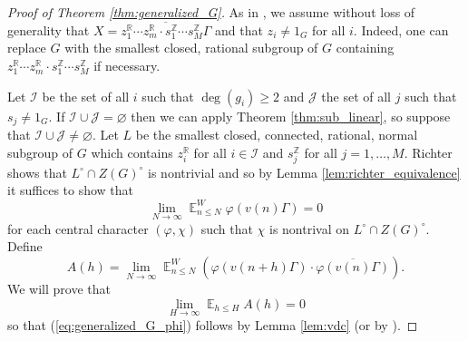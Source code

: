 \documentclass[12pt]{article}
\theoremstyle{plain} %
\theoremstyle{definition} %
\theoremstyle{plain}
\theoremstyle{plain}
\numberwithin{equation}{section}
\newcommand{\Z}{\mathbb{Z}}
\newcommand{\R}{\mathbb{R}}
\renewcommand{\leq}{\leqslant}
\renewcommand{\geq}{\geqslant}
\newcommand{\1}{\mathbbm{1}}
\newcommand{\E}{\operatorname{\mathbb{E}}}
\newcommand{\oo}{\infty}
\begin{document}
 \begin{proof}[Proof of Theorem \ref{thm:generalized_G}]
 As in \cite[p. 453]{Richter23}, we assume without loss of generality that $X = \overline{z_1^{\R}\cdots z_{m}^{\R}\cdot s_1^{\Z}\cdots s_M^{\Z}\Gamma}$ and that $z_i\neq 1_G$ for all $i$. Indeed, one can replace $G$ with the smallest closed, rational subgroup of $G$ containing $z_1^{\R}\cdots z_{m}^{\R}\cdot s_1^{\Z}\cdots s_M^{\Z}$ if necessary. 
 
 Let $\mathscr{I}$ be the set of all $i$ such that $\deg(g_i)\geq 2$ and $\mathscr{J}$ the set of all $j$ such that $s_j\neq 1_{G}$. If $\mathscr{I}\cup \mathscr{J}=\varnothing$ then we can apply Theorem \ref{thm:sub_linear}, so suppose that $\mathscr{I}\cup \mathscr{J}\neq \varnothing$. Let $L$ be the smallest closed, connected, rational, normal subgroup of $G$ which contains $z_i^{\R}$ for all $i\in \mathscr{I}$ and $s_{j}^{\Z}$ for all $j=1,\dots, M$. Richter shows that $L^{\circ}\cap Z(G)^{\circ}$ is nontrivial \cite[p. 454]{Richter23} and so by Lemma \ref{lem:richter_equivalence} it suffices to show that 
 \begin{equation}\label{eq:generalized_G_phi}
     \lim_{N\to\oo}\E_{n\leq N}^W\varphi(v(n)\Gamma)=0
 \end{equation}
 for each central character $(\varphi,\chi)$ such that $\chi$ is nontrival on $L^{\circ}\cap Z(G)^{\circ}$. Define 
 $$
 A(h) = \lim_{N\to\oo}\E_{n\leq N}^W(\varphi(v(n+h)\Gamma)\cdot \overline{\varphi(v(n)\Gamma)}).
 $$
  We will prove that
 \begin{equation}
\lim_{H\to\oo}\E_{h\leq H}A(h)=0
 \end{equation}
 so that (\ref{eq:generalized_G_phi}) follows by Lemma \ref{lem:vdc} (or by {\cite[Theorem A.8]{Richter23}}).


 



\end{proof}
\end{document}
